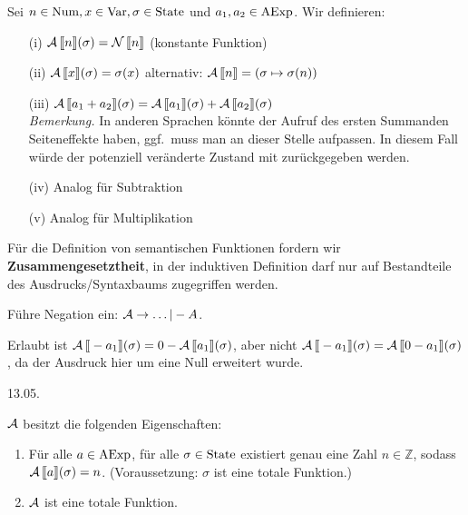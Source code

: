 \begin{definition}\label{def:Asem}
    Sei $n \in \Num, x \in \Var, \sigma \in \State$ und $a_1, a_2 \in \AExp$. Wir definieren:
    \begin{enumerate}
        \item[(i)] $\A\lsem n \rsem(\sigma) = \N\lsem n \rsem$ \quad\quad (konstante Funktion)
        \item[(ii)] $\A\lsem x \rsem(\sigma) = \sigma(x)$ \quad\quad\quad alternativ: $\A\lsem n \rsem = (\sigma \mapsto \sigma(n))$
        \item[(iii)] $\A\lsem a_1 + a_2 \rsem(\sigma) = \A\lsem a_1 \rsem(\sigma) + \A\lsem a_2 \rsem(\sigma)$ \\[4pt]
        \emph{Bemerkung.} In anderen Sprachen könnte der Aufruf des ersten Summanden Seiteneffekte haben, \dh{} ggf.\ muss man an dieser Stelle aufpassen. In diesem Fall würde der potenziell veränderte Zustand mit zurückgegeben werden.
        \item[(iv)] Analog für Subtraktion
        \item[(v)] Analog für Multiplikation
    \end{enumerate}
\end{definition}

\begin{remark}
    Für die Definition von semantischen Funktionen fordern wir \textbf{Zusammengesetztheit}, \dh{} in der induktiven Definition darf nur auf Bestandteile des Ausdrucks/Syntaxbaums zugegriffen werden.
\end{remark}

\begin{example}
    Führe Negation ein: $\A \to \dots | -A$.

    Erlaubt ist $\A\lsem -a_1 \rsem(\sigma) = 0 - \A\lsem a_1 \rsem(\sigma)$, aber nicht $\A\lsem -a_1 \rsem(\sigma) = \A\lsem 0 - a_1 \rsem(\sigma)$, da der Ausdruck hier um eine Null erweitert wurde.
\end{example}



\newpage
\hfill 13.05.

\begin{theorem}
    $\A$ besitzt die folgenden Eigenschaften:
    \begin{enumerate}
        \item Für alle $a \in \AExp$, für alle $\sigma \in \State$ existiert genau eine Zahl $n \in \mathbb{Z}$, sodass $\A\lsem a \rsem (\sigma) = n$. (Voraussetzung: $\sigma$ ist eine totale Funktion.)
        \item $\A$ ist eine totale Funktion.
    \end{enumerate}
\end{theorem}

